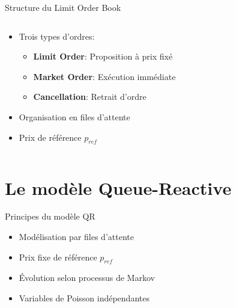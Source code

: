 \documentclass[aspectratio=169]{beamer}  %
\begin{document}
\begin{frame}{Structure du Limit Order Book}
    \begin{columns}
        \begin{column}{0.6\textwidth}
            \begin{itemize}
                \item Trois types d'ordres:
                \begin{itemize}
                    \item \textbf{Limit Order}: Proposition à prix fixé
                    \item \textbf{Market Order}: Exécution immédiate
                    \item \textbf{Cancellation}: Retrait d'ordre
                \end{itemize}
                \item Organisation en files d'attente
                \item Prix de référence $p_{ref}$
            \end{itemize}
        \end{column}
        \begin{column}{0.4\textwidth}
        \end{column}
    \end{columns}
\end{frame}

\section{Le modèle Queue-Reactive}

\begin{frame}{Principes du modèle QR}
    \begin{itemize}
        \item Modélisation par files d'attente
        \item Prix fixe de référence $p_{ref}$
        \item Évolution selon processus de Markov
        \item Variables de Poisson indépendantes
    \end{itemize}
\end{frame}
\end{document}
